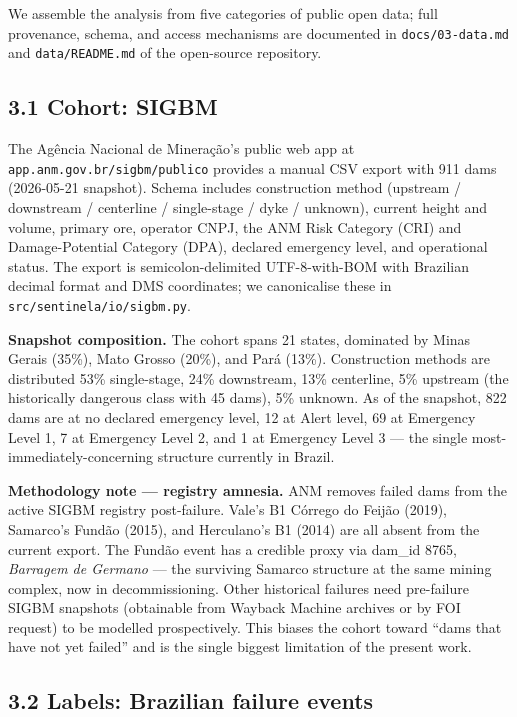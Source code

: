 \documentclass[
  11pt]{article}
\begin{document}
We assemble the analysis from five categories of public open data; full
provenance, schema, and access mechanisms are documented in
\texttt{docs/03-data.md} and \texttt{data/README.md} of the open-source
repository.

\subsection{3.1 Cohort: SIGBM}\label{cohort-sigbm}

The Agência Nacional de Mineração's public web app at
\texttt{app.anm.gov.br/sigbm/publico} provides a manual CSV export with
911 dams (2026-05-21 snapshot). Schema includes construction method
(upstream / downstream / centerline / single-stage / dyke / unknown),
current height and volume, primary ore, operator CNPJ, the ANM Risk
Category (CRI) and Damage-Potential Category (DPA), declared emergency
level, and operational status. The export is semicolon-delimited
UTF-8-with-BOM with Brazilian decimal format and DMS coordinates; we
canonicalise these in \texttt{src/sentinela/io/sigbm.py}.

\textbf{Snapshot composition.} The cohort spans 21 states, dominated by
Minas Gerais (35\%), Mato Grosso (20\%), and Pará (13\%). Construction
methods are distributed 53\% single-stage, 24\% downstream, 13\%
centerline, 5\% upstream (the historically dangerous class with 45
dams), 5\% unknown. As of the snapshot, 822 dams are at no declared
emergency level, 12 at Alert level, 69 at Emergency Level 1, 7 at
Emergency Level 2, and 1 at Emergency Level 3 --- the single
most-immediately-concerning structure currently in Brazil.

\textbf{Methodology note --- registry amnesia.} ANM removes failed dams
from the active SIGBM registry post-failure. Vale's B1 Córrego do Feijão
(2019), Samarco's Fundão (2015), and Herculano's B1 (2014) are all
absent from the current export. The Fundão event has a credible proxy
via dam\_id 8765, \emph{Barragem de Germano} --- the surviving Samarco
structure at the same mining complex, now in decommissioning. Other
historical failures need pre-failure SIGBM snapshots (obtainable from
Wayback Machine archives or by FOI request) to be modelled
prospectively. This biases the cohort toward ``dams that have not yet
failed'' and is the single biggest limitation of the present work.

\subsection{3.2 Labels: Brazilian failure
events}\label{labels-brazilian-failure-events}
\end{document}

